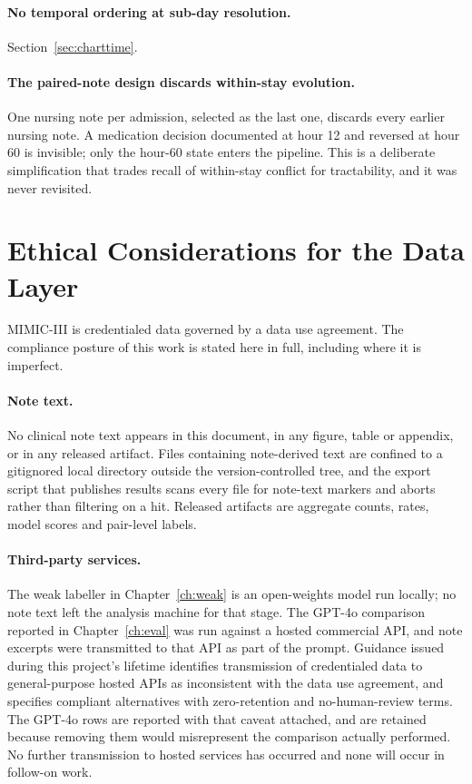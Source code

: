 \paragraph{No temporal ordering at sub-day resolution.} Section~\ref{sec:charttime}.

\paragraph{The paired-note design discards within-stay evolution.} One nursing
note per admission, selected as the last one, discards every earlier nursing
note. A medication decision documented at hour 12 and reversed at hour 60 is
invisible; only the hour-60 state enters the pipeline. This is a deliberate
simplification that trades recall of within-stay conflict for tractability, and
it was never revisited.

\section{Ethical Considerations for the Data Layer}
\label{sec:data-ethics}

MIMIC-III is credentialed data governed by a data use agreement. The compliance
posture of this work is stated here in full, including where it is imperfect.

\paragraph{Note text.} No clinical note text appears in this document, in any
figure, table or appendix, or in any released artifact. Files containing
note-derived text are confined to a gitignored local directory outside the
version-controlled tree, and the export script that publishes results scans every
file for note-text markers and aborts rather than filtering on a hit. Released
artifacts are aggregate counts, rates, model scores and pair-level labels.

\paragraph{Third-party services.} The weak labeller in Chapter~\ref{ch:weak} is
an open-weights model run locally; no note text left the analysis machine for
that stage. The GPT-4o comparison reported in Chapter~\ref{ch:eval} was run
against a hosted commercial API, and note excerpts were transmitted to that API
as part of the prompt. Guidance issued during this project's lifetime identifies
transmission of credentialed data to general-purpose hosted APIs as inconsistent
with the data use agreement, and specifies compliant alternatives with
zero-retention and no-human-review terms. The GPT-4o rows are reported with that
caveat attached, and are retained because removing them would misrepresent the
comparison actually performed. No further transmission to hosted services has
occurred and none will occur in follow-on work.

